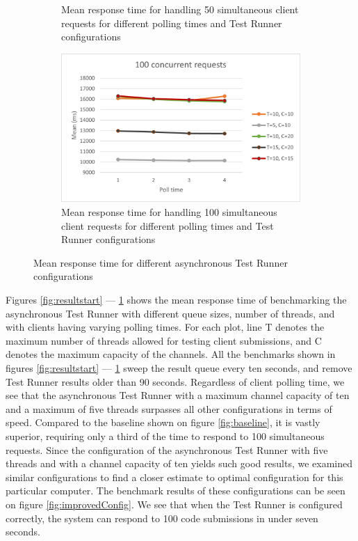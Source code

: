 \begin{figure}
\begin{subfigure}[b]{0.45\textwidth}
    \caption{Mean response time for handling 50 simultaneous client requests for different polling times and Test Runner configurations}
  \end{subfigure}
  \hfill
  \begin{subfigure}[b]{0.45\textwidth}
    \centering
    \includegraphics[scale=0.65]{images/100.png}
    \caption{Mean response time for handling 100 simultaneous client requests for different polling times and Test Runner configurations}
    \label{fig:resultEnd}
  \end{subfigure}
\caption{Mean response time for different asynchronous Test Runner configurations}
\label{fig:configResults}
\end{figure}

Figures \ref{fig:resultstart} --- \ref{fig:resultEnd} shows the mean response time of benchmarking the asynchronous Test Runner with different queue sizes, number of threads, and with clients having varying polling times. 
For each plot, line T denotes the maximum number of threads allowed for testing client submissions, and C denotes the maximum capacity of the channels. 
All the benchmarks shown in figures \ref{fig:resultstart} --- \ref{fig:resultEnd} sweep the result queue every ten seconds, and remove Test Runner results older than 90 seconds. 
Regardless of client polling time, we see that the asynchronous Test Runner with a maximum channel capacity of ten and a maximum of five threads surpasses all other configurations in terms of speed.
Compared to the baseline shown on figure \ref{fig:baseline}, it is vastly superior, requiring only a third of the time to respond to 100 simultaneous requests. 
Since the configuration of the asynchronous Test Runner with five threads and with a channel capacity of ten yields such good results, we examined similar configurations to find a closer estimate to optimal configuration for this particular computer. 
The benchmark results of these configurations can be seen on figure \ref{fig:improvedConfig}.
We see that when the Test Runner is configured correctly, the system can respond to 100 code submissions in under seven seconds.

